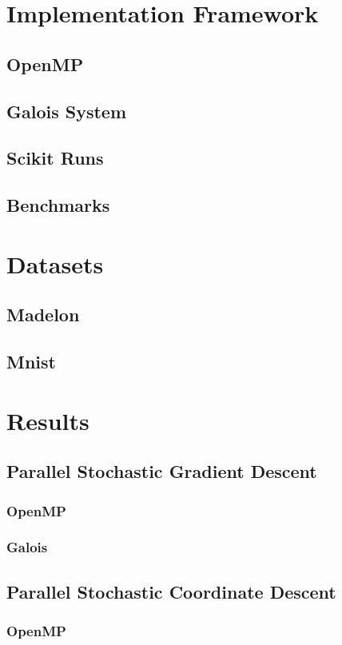 \documentclass{sigplanconf}
\begin{document}
\section{Implementation Framework}
\subsection{OpenMP}
\subsection{Galois System}
\subsection{Scikit Runs}
\subsection{Benchmarks}

\section{Datasets}
\subsection{Madelon}
\subsection{Mnist}

\section{Results}
\subsection{Parallel Stochastic Gradient Descent}
\subsubsection{OpenMP}
\subsubsection{Galois}
\subsection{Parallel Stochastic Coordinate Descent}
\subsubsection{OpenMP}
\end{document}

